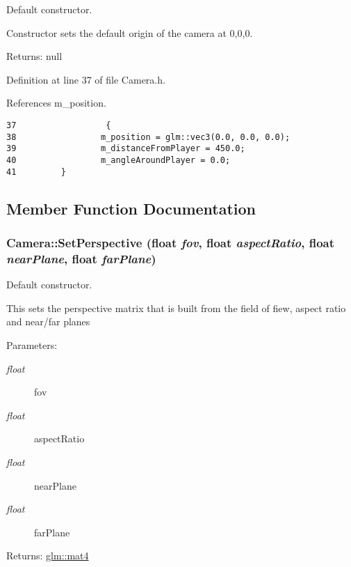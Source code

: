 Default constructor. 

Constructor sets the default origin of the camera at 0,0,0.

\begin{Desc}
\item[Returns:]null \end{Desc}


Definition at line 37 of file Camera.h.

References m\_\-position.

\begin{Code}\begin{verbatim}37                  { 
38                 m_position = glm::vec3(0.0, 0.0, 0.0); 
39                 m_distanceFromPlayer = 450.0;
40                 m_angleAroundPlayer = 0.0;
41         }
\end{verbatim}
\end{Code}




\subsection{Member Function Documentation}
\hypertarget{class_camera_621b0ca0ddcab43fb95ee754c443dfa4}{
\subsubsection[SetPerspective]{ Camera::SetPerspective (float {\em fov}, \/  float {\em aspectRatio}, \/  float {\em nearPlane}, \/  float {\em farPlane})}}
\label{class_camera_621b0ca0ddcab43fb95ee754c443dfa4}


Default constructor. 

This sets the perspective matrix that is built from the field of fiew, aspect ratio and near/far planes

\begin{Desc}
\item[Parameters:]
\begin{description}
\item[{\em float}]fov \item[{\em float}]aspectRatio \item[{\em float}]nearPlane \item[{\em float}]farPlane \end{description}
\end{Desc}
\begin{Desc}
\item[Returns:]\hyperlink{group__core__types_g7dcd2365c2e368e6af5b7adeb6a9c8df}{glm::mat4} \end{Desc}


